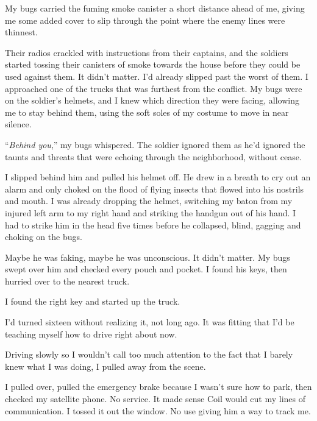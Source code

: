 My bugs carried the fuming smoke canister a short distance ahead of me, giving me some added cover to slip through the point where the enemy lines were thinnest.



Their radios crackled with instructions from their captains, and the soldiers started tossing their canisters of smoke towards the house before they could be used against them.  It didn't matter.  I'd already slipped past the worst of them.  I approached one of the trucks that was furthest from the conflict.  My bugs were on the soldier's helmets, and I knew which direction they were facing, allowing me to stay behind them, using the soft soles of my costume to move in near silence.



``\emph{Behind you},'' my bugs whispered.  The soldier ignored them as he'd ignored the taunts and threats that were echoing through the neighborhood, without cease.



I slipped behind him and pulled his helmet off.  He drew in a breath to cry out an alarm and only choked on the flood of flying insects that flowed into his nostrils and mouth.  I was already dropping the helmet, switching my baton from my injured left arm to my right hand and striking the handgun out of his hand.  I had to strike him in the head five times before he collapsed, blind, gagging and choking on the bugs.



Maybe he was faking, maybe he was unconscious.  It didn't matter.  My bugs swept over him and checked every pouch and pocket.  I found his keys, then hurried over to the nearest truck.



I found the right key and started up the truck.



I'd turned sixteen without realizing it, not long ago.  It was fitting that I'd be teaching myself how to drive right about now.



Driving slowly so I wouldn't call too much attention to the fact that I barely knew what I was doing, I pulled away from the scene.



\sectionbreak



I pulled over, pulled the emergency brake because I wasn't sure how to park, then checked my satellite phone.  No service.  It made sense Coil would cut my lines of communication.  I tossed it out the window.  No use giving him a way to track me.



